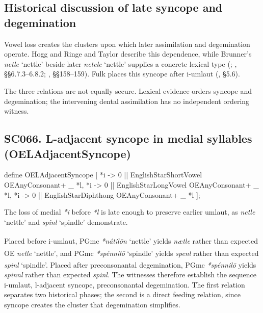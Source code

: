\documentclass[
  british,
  a4paper,
  openany]{book}
\providecommand{\Pred}[1]{\textsuperscript{\dag}\emph{#1}}
\providecommand{\Recon}[1]{\emph{*#1}}
{\catcode`→=\active \global\def→{\ensuremath{\rightarrow}}}
\providecommand{\texorpdfstring}[2]{#1}
\DeclareRobustCommand{\CAPRRuleHeading}[2]{%
  #1\texorpdfstring{\\(#2)}{ (#2)}%
}
\providecommand{\Pred}[1]{\textsuperscript{\dag}\emph{#1}}
\providecommand{\Recon}[1]{\emph{*#1}}
{\catcode`→=\active \global\def→{\ensuremath{\rightarrow}}}
\begin{document}
\subsection{Historical discussion of late syncope and
degemination}\label{historical-discussion-of-late-syncope-and-degemination}

Vowel loss creates the clusters upon which later assimilation and
degemination operate. Hogg and Ringe and Taylor describe this
dependence, while Brunner's \emph{netle} `nettle' beside later
\emph{netele} `nettle' supplies a concrete lexical type
(;
,
§§6.7.3--6.8.2; , §§158--159). Fulk places this syncope after i-umlaut
(, §5.6).

The three relations are not equally secure. Lexical evidence orders
syncope and degemination; the intervening dental assimilation has no
independent ordering witness.

\subsection{\texorpdfstring{\CAPRRuleHeading{SC066. L-adjacent syncope in medial syllables}{OELAdjacentSyncope}}{}}\label{rule-OELAdjacentSyncope}

\begin{ReaderFacingFoma}
define OELAdjacentSyncope [
    {*i} -> 0 || EnglishStarShortVowel OEAnyConsonant+ _ {*l},
    {*i} -> 0 || EnglishStarLongVowel OEAnyConsonant+ _ {*l},
    {*i} -> 0 || EnglishStarDiphthong OEAnyConsonant+ _ {*l}
];
\end{ReaderFacingFoma}

The loss of medial \emph{*i} before \emph{*l} is late enough to preserve
earlier umlaut, as \emph{netle} `nettle' and \emph{spinl} `spindle'
demonstrate.

Placed before i-umlaut, PGmc \Recon{nátilōn} `nettle' yields
\Pred{nætle} rather than expected OE \emph{netle} `nettle', and PGmc
\Recon{spénnilō} `spindle' yields \Pred{spenl} rather than expected
\emph{spinl} `spindle'. Placed after preconsonantal degemination, PGmc
\Recon{spénnilō} yields \Pred{spinnl} rather than expected \emph{spinl}.
The witnesses therefore establish the sequence i-umlaut, l-adjacent
syncope, preconsonantal degemination. The first relation separates two
historical phases; the second is a direct feeding relation, since
syncope creates the cluster that degemination simplifies.
\end{document}
